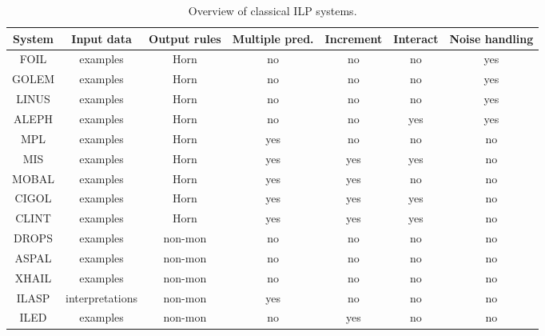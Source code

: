 \begin{table}[t]
\centering
\begin{tabular}{|c|c|c|c|c|c|c|}
\hline
System & Input data&Output rules & Multiple pred. &Increment & Interact &Noise handling\\
\hline
FOIL \cite{foil} & examples&Horn& no &no & no  &yes \\
GOLEM \cite{golem} &examples&Horn&  no &no & no & yes \\
LINUS \cite{linus} &examples&Horn&  no& no & no & yes \\
ALEPH \cite{aleph} &examples&Horn&  no &no & yes & yes \\
MPL \cite{mpl} &examples&Horn&  yes &no & no & no \\
MIS \cite{mis} &examples&Horn&  yes &yes & yes & no \\
MOBAL \cite{mobal} &examples&Horn&  yes &yes & no & no \\
CIGOL \cite{cigol} &examples&Horn&  yes &yes & yes & no \\
CLINT \cite{clint} &examples&Horn&  yes &yes & yes & no \\
DROPS \cite{CorapiRL10}&examples&non-mon&no&no&no&no\\
ASPAL \cite{ASPAL}&examples&non-mon&no&no&no&no\\
XHAIL \cite{XHAIL}&examples&non-mon&no&no&no&no\\
ILASP \cite{ILASP_system}&interpretations&non-mon&yes&no&no&no\\
ILED \cite{ILED}&examples&non-mon&no&yes&no&no\\
\hline
\end{tabular}
\caption{Overview of classical ILP systems.}
\label{tab:ilp}
\end{table}